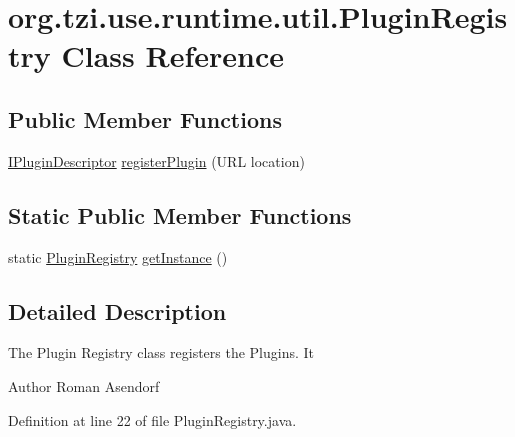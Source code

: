 \hypertarget{classorg_1_1tzi_1_1use_1_1runtime_1_1util_1_1_plugin_registry}{\section{org.\-tzi.\-use.\-runtime.\-util.\-Plugin\-Registry Class Reference}
\label{classorg_1_1tzi_1_1use_1_1runtime_1_1util_1_1_plugin_registry}
}
\subsection*{Public Member Functions}
\begin{DoxyCompactItemize}
\item 
\hyperlink{interfaceorg_1_1tzi_1_1use_1_1runtime_1_1_i_plugin_descriptor}{I\-Plugin\-Descriptor} \hyperlink{classorg_1_1tzi_1_1use_1_1runtime_1_1util_1_1_plugin_registry_a277f5711b71fadecf0da9f17ea9a8f6c}{register\-Plugin} (U\-R\-L location)
\end{DoxyCompactItemize}
\subsection*{Static Public Member Functions}
\begin{DoxyCompactItemize}
\item 
static \hyperlink{classorg_1_1tzi_1_1use_1_1runtime_1_1util_1_1_plugin_registry}{Plugin\-Registry} \hyperlink{classorg_1_1tzi_1_1use_1_1runtime_1_1util_1_1_plugin_registry_a213a86b3a9f2cd1cabd4673bc3ccb50b}{get\-Instance} ()
\end{DoxyCompactItemize}


\subsection{Detailed Description}
The Plugin Registry class registers the Plugins. It

\begin{DoxyAuthor}{Author}
Roman Asendorf 
\end{DoxyAuthor}


Definition at line 22 of file Plugin\-Registry.\-java.



